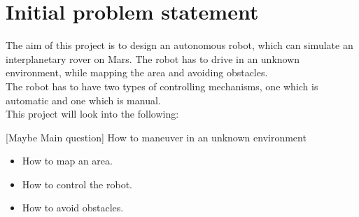 \chapter{Initial problem statement}

The aim of this project is to design an autonomous robot, which can simulate an interplanetary rover on Mars. The robot has to drive in an unknown environment, while mapping the area and avoiding obstacles.\\ The robot has to have two types of controlling mechanisms, one which is automatic and one which is manual.\\
This project will look into the following:

[Maybe Main question] How to maneuver in an unknown environment
\begin{itemize}
\item How to map an area.
\item How to control the robot.
\item How to avoid obstacles.
\end{itemize}











